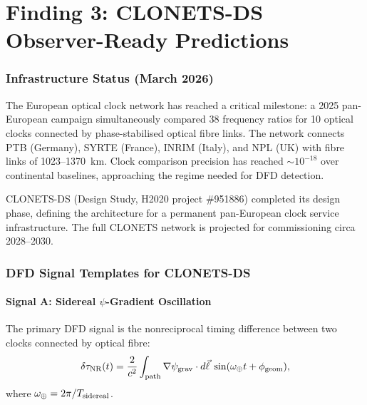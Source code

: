 \documentclass[11pt,a4paper]{article}
\newcommand{\psigrav}{\psi_{\rm grav}}
\begin{document}
\part{Finding 3: CLONETS-DS Observer-Ready Predictions}
\label{part:CLONETS}

\section{Infrastructure Status (March 2026)}
\label{sec:CLONETS-status}

The European optical clock network has reached a critical milestone:
a 2025 pan-European campaign simultaneously compared 38 frequency
ratios for 10 optical clocks connected by phase-stabilised optical
fibre links. The network connects PTB (Germany), SYRTE (France),
INRIM (Italy), and NPL (UK) with fibre links of 1023--1370~km.
Clock comparison precision has reached $\sim 10^{-18}$ over
continental baselines, approaching the regime needed for DFD
detection.

CLONETS-DS (Design Study, H2020 project \#951886) completed its
design phase, defining the architecture for a permanent pan-European
clock service infrastructure. The full CLONETS network is projected
for commissioning circa 2028--2030.

\section{DFD Signal Templates for CLONETS-DS}
\label{sec:signal-templates}

\subsection{Signal A: Sidereal $\psi$-Gradient Oscillation}

The primary DFD signal is the nonreciprocal timing difference between
two clocks connected by optical fibre:
\begin{equation}
\delta\tau_{\rm NR}(t) = \frac{2}{c^2}\int_{\rm path}
\nabla\psigrav\cdot d\vec{\ell}\;\sin(\omega_\oplus t + \phi_{\rm geom}),
\end{equation}
where $\omega_\oplus = 2\pi/T_{\rm sidereal}$.
\end{document}
